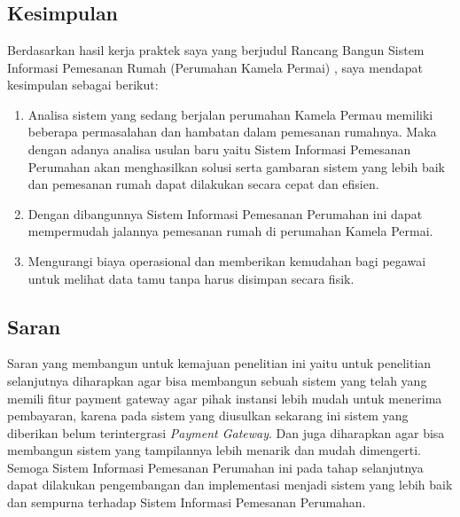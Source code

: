 %


%

\chapter{\babLima}
\section{Kesimpulan}
\par Berdasarkan hasil kerja praktek saya yang berjudul Rancang Bangun Sistem Informasi Pemesanan Rumah (Perumahan Kamela Permai) , saya mendapat kesimpulan sebagai berikut:
\begin{enumerate}
\item Analisa sistem yang sedang berjalan perumahan Kamela Permau memiliki beberapa permasalahan dan hambatan dalam pemesanan rumahnya. Maka dengan adanya analisa usulan baru yaitu Sistem Informasi Pemesanan Perumahan akan menghasilkan solusi serta gambaran sistem yang lebih baik dan pemesanan rumah dapat dilakukan secara cepat dan efisien.
\item Dengan dibangunnya Sistem Informasi Pemesanan Perumahan ini dapat mempermudah jalannya pemesanan rumah di perumahan Kamela Permai.
\item Mengurangi biaya operasional dan memberikan kemudahan bagi pegawai untuk melihat data tamu tanpa harus disimpan secara fisik.
\end{enumerate}
\section{Saran}
\par Saran yang membangun untuk kemajuan penelitian ini yaitu untuk penelitian selanjutnya diharapkan agar bisa membangun sebuah sistem yang telah yang memili fitur payment gateway agar pihak instansi lebih mudah untuk menerima pembayaran, karena pada sistem yang diusulkan sekarang ini sistem yang diberikan belum terintergrasi \textit{Payment Gateway}. Dan juga diharapkan agar bisa membangun sistem yang tampilannya lebih menarik dan mudah dimengerti. Semoga Sistem Informasi Pemesanan Perumahan ini pada tahap selanjutnya dapat dilakukan pengembangan dan implementasi menjadi sistem yang lebih baik dan sempurna terhadap Sistem Informasi Pemesanan Perumahan.

